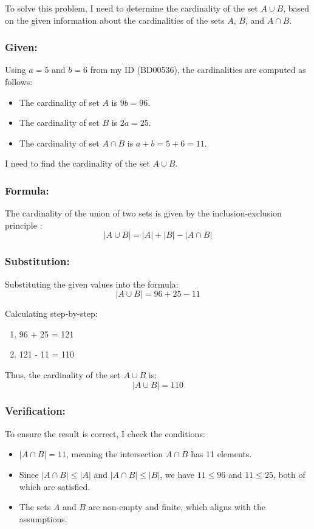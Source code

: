 \documentclass[12pt, a4paper, twoside]{report} %
\begin{document}
  To solve this problem, I need to determine the cardinality of the set $A \cup B$, based on the given information about the cardinalities of the sets $A$, $B$, and $A \cap B$.

\subsubsection*{Given:}
  Using \(a = 5\) and \(b = 6\) from my ID (BD00536), the cardinalities are computed as follows:
  \begin{itemize}
    \item The cardinality of set \(A\) is \(\overline{9b} = 96\).
    \item The cardinality of set \(B\) is \(\overline{2a} = 25\).
    \item The cardinality of set \(A \cap B\) is \(a + b = 5 + 6 = 11\).
  \end{itemize}
  I need to find the cardinality of the set \(A \cup B\).

\subsubsection*{Formula:}
  The cardinality of the union of two sets is given by the inclusion-exclusion principle \citep{rosen2019}:
  \[
  |A \cup B| = |A| + |B| - |A \cap B|
  \]

\subsubsection*{Substitution:}
  Substituting the given values into the formula:
  \[
  |A \cup B| = 96 + 25 - 11
  \]

  Calculating step-by-step:
  \begin{enumerate}
    \item 96 + 25 = 121
    \item 121 - 11 = 110
  \end{enumerate}


  Thus, the cardinality of the set \( A \cup B \) is:
  \[
  |A \cup B| = 110
  \]

\subsubsection*{Verification:}
  To ensure the result is correct, I check the conditions:

\begin{itemize}
  \item \( |A \cap B| = 11 \), meaning the intersection \( A \cap B \) has 11 elements.
  \item Since \( |A \cap B| \leq |A| \) and \( |A \cap B| \leq |B| \), we have \( 11 \leq 96 \) and \( 11 \leq 25 \), both of which are satisfied.
  \item The sets \( A \) and \( B \) are non-empty and finite, which aligns with the assumptions.
\end{itemize}
\end{document}
